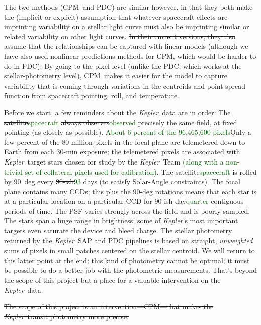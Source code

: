 \documentclass[12pt, preprint]{aastex}
\newcommand{\project}[1]{\textsl{#1}}
\newcommand{\Kepler}{\project{Kepler}}
\newcommand{\name}{CPM}
\newcommand{\revise}[1]{\textcolor{darkgreen}{#1}}
\newcommand{\remove}[1]{\sout{#1}}
\begin{document}
The two methods (\name\ and PDC) are similar however,
  in that they both make the \remove{(implicit or explicit)} assumption that whatever spacecraft effects are imprinting variability on a stellar light curve must also be imprinting similar or related variability on other light curves.
\remove{In their current versions, they also assume that the relationships can be captured with linear models (although we have also used nonlinear predictions methods for \name, which would be harder to do in PDC).}
By going to the pixel level (unlike the PDC, which works at the stellar-photometry level), \name\ makes it easier for the model to capture variability that is coming through variations in the centroids and point-spread function from spacecraft pointing, roll, and temperature.

Before we start, a few reminders about the \Kepler\ data are in order:
The \remove{satellite}\revise{spacecraft} \remove{always observes}\revise{observed} precisely the same field, at fixed pointing (as closely as possible).
\revise{About 6 percent of the 96,465,600 pixels}\remove{Only a few percent of the 80 million pixels} in the focal plane are telemetered down
  to Earth from each 30-min exposure;
  the telemetered pixels are associated with \Kepler\ target stars chosen for study by the \Kepler\ Team \revise{(along with a non-trivial set of collateral pixels used for calibration)}.
The \remove{satellite}\revise{spacecraft} is rolled by 90~deg every \remove{90-ish}\revise{93} days (to satisfy Solar-Angle constraints).
The focal plane contains many CCDs;
  this plus the 90-deg rotations means that each star is at a particular location
  on a particular CCD for \remove{90-ish-day}\revise{quarter} contiguous periods of time.
The PSF varies strongly across the field and is poorly sampled.
The stars span a huge range in brightness;
  some of \Kepler's most important targets even saturate the device and bleed charge.
The stellar photometry returned by the \Kepler\ SAP and PDC pipelines is based on
  straight, \emph{unweighted} sums of pixels in small patches centered on the stellar centroid.
We will return to this latter point at the end;
  this kind of photometry cannot be optimal;
  it must be possible to do a better job with the photometric measurements.
That's beyond the scope of this project but a place for a valuable intervention on the \Kepler\ data.

\remove{The scope of this project is an intervention---\name---that makes the \Kepler\ transit photometry more precise.}
\end{document}
